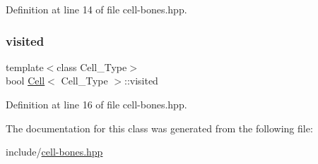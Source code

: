 Definition at line 14 of file cell-\/bones.\+hpp.

\mbox{\label{class_cell_a1f539a05953fa05d723c32e718f0eeb3}} 
\subsubsection{\texorpdfstring{visited}{visited}}
{\footnotesize\ttfamily template$<$class Cell\+\_\+\+Type$>$ \\
bool \hyperlink{class_cell}{Cell}$<$ Cell\+\_\+\+Type $>$\+::visited}



Definition at line 16 of file cell-\/bones.\+hpp.



The documentation for this class was generated from the following file\+:\begin{DoxyCompactItemize}
\item 
include/\hyperlink{cell-bones_8hpp}{cell-\/bones.\+hpp}\end{DoxyCompactItemize}
